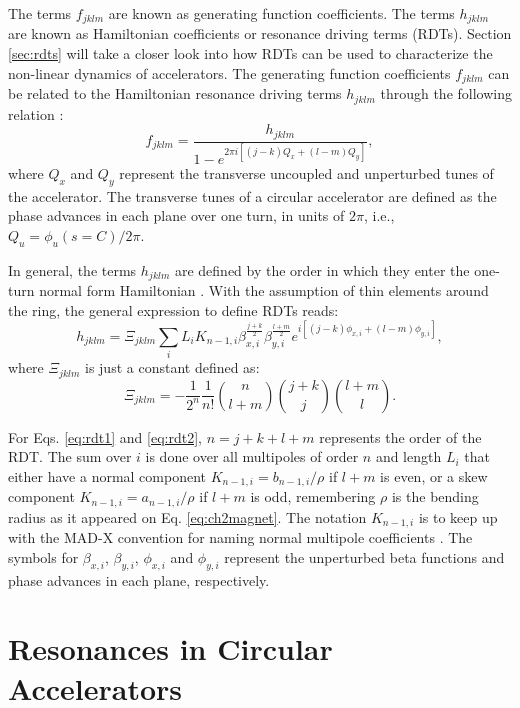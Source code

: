 The terms $f_{jklm}$ are known as generating function coefficients. The terms $h_{jklm}$ are known as Hamiltonian coefficients or resonance driving terms (RDTs). Section \ref{sec:rdts} will take a closer look into how RDTs can be used to characterize the non-linear dynamics of accelerators. The generating function coefficients $f_{jklm}$ can be related to the Hamiltonian resonance driving terms $h_{jklm}$ through the following relation \cite{cernthesis1,bartolini}:
\begin{equation}
    \label{eq:handf}
    f_{jklm}=\frac{h_{jklm}}{1-e^{2\pi i \left[ \left( j-k \right) Q_x + \left( l-m\right) Q_y \right] }},
\end{equation}
where $Q_x$ and $Q_y$ represent the transverse uncoupled and unperturbed tunes of the accelerator. The transverse tunes of a circular accelerator are defined as the phase advances in each plane over one turn, in units of $2\pi$, i.e., $Q_u=\phi_u(s=C)/2\pi$. 

In general, the terms $h_{jklm}$ are defined by the order in which they enter the one-turn normal form Hamiltonian \cite{bartolini}. With the assumption of thin elements around the ring, the general expression to define RDTs reads:
\begin{equation}
    \label{eq:rdt1}
    h_{jklm}=\Xi _{jklm} \sum_i L_i K_{n-1,i} \beta_{x,i}^{\frac{j+k}{2}} \beta_{y,i}^{\frac{l+m}{2}} e^{i\left[ (j-k)\phi_{x,i} +(l-m) \phi_{y,i} \right]},
\end{equation}
where $\Xi _{jklm}$ is just a constant defined as:
\begin{equation}
    \label{eq:rdt2}
    \Xi _{jklm} = -\frac{1}{2^n}\frac{1}{n!} {\binom{n}{l+m}} {\binom{j+k}{j}}{\binom{l+m}{l}}.
\end{equation}

For Eqs. \ref{eq:rdt1} and \ref{eq:rdt2}, $n=j+k+l+m$ represents the order of the RDT. The sum over $i$ is done over all multipoles of order $n$ and length $L_i$ that either have a normal component $K_{n-1,i}=b_{n-1,i}/\rho$ if $l+m$ is even, or a skew component $K_{n-1,i}=a_{n-1,i}/\rho$ if $l+m$ is odd, remembering $\rho$ is the bending radius as it appeared on Eq. \ref{eq:ch2magnet}. The notation $K_{n-1,i}$ is to keep up with the MAD-X convention for naming normal multipole coefficients \cite{madx}. The symbols for $\beta_{x,i}$, $\beta_{y,i}$, $\phi_{x,i}$ and $\phi_{y,i}$ represent the unperturbed beta functions and phase advances in each plane, respectively.

\section{\label{sec:resonances}Resonances in Circular Accelerators}

